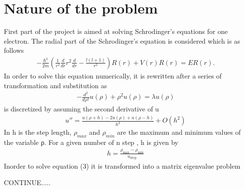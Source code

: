 \section{Nature of the problem}
\label{sec:NatureOfTheProblem}
First part of the project is aimed at solving Schrodinger’s equations for one electron. The radial part of the Schrodinger’s equation is considered which is as follows
\begin{align}
-\frac{\hbar^2}{2 m} \left ( \frac{1}{r^2} \frac{d}{dr} r^2
  \frac{d}{dr} - \frac{l (l + 1)}{r^2} \right )R(r) 
     + V(r) R(r) = E R(r).
     \label{eq:NatureOfTheProblem1}
\end{align}
In order to solve this equation numerically, it is rewritten after a series of transformation and substitution as
\begin{align}
	-\frac{d^2}{d\rho^2} u(\rho) + \rho^2u(\rho)  = \lambda u(\rho)
	\label{eq:NatureOfTheProblem2}
\end{align}
 is discretized by assuming the second derivative of u
\begin{align}
	u''=\frac{u(\rho+h) -2u(\rho) +u(\rho-h)}{h^2} +O(h^2)
	\label{eq:NatureOfTheProblem3}
\end{align}   
In  h is the step length, $\rho_{max}$ and $\rho_{min}$ are the maximum and minimum values of the variable ρ. For a given number of n step , h is given by
\begin{align}
	h=\frac{\rho_{\mathrm{max}}-\rho_{\mathrm{min}} }{n_{\mathrm{step}}}
	\label{eq:NatureOfTheProblem4}
\end{align}
Inorder to solve equation (3) it is transformed into a matrix eigenvalue problem 

CONTINUE.....